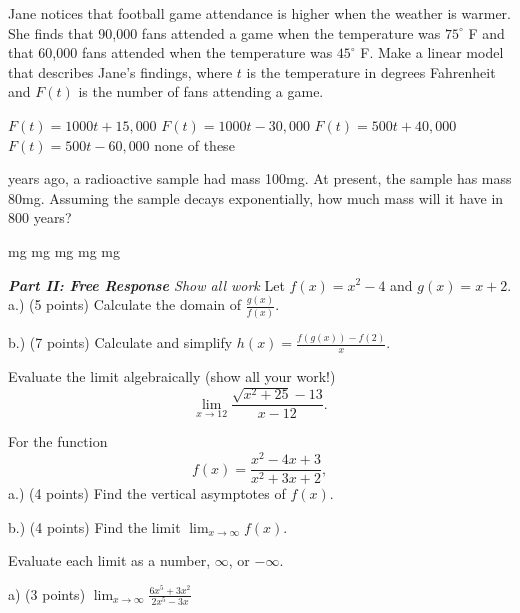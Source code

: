 \documentclass[11pt]{article}
\begin{document}
\begin{questions}
\begin{multiplechoice}{5}
\question Jane notices that football game attendance is higher when the weather is warmer.  She finds that 90,000 fans attended a game when the temperature was $75^\circ$ F and that 60,000 fans attended when the temperature was $45^\circ$ F.  Make a linear model that describes Jane's findings, where $t$ is the temperature in degrees Fahrenheit and $F(t)$ is the number of fans attending a game.
\begin{answers}{3}
\ans $F(t) = 1000t+15,000$
\ans $F(t) = 1000t-30,000$
\ans $F(t) = 500t+40,000$
\ans $F(t) = 500t - 60,000$
\ans none of these
\end{answers}

 years ago, a radioactive sample had mass 100mg.  At present, the sample has mass 80mg.  Assuming the sample decays exponentially, how much mass will it have in 800 years?
\begin{answers}{2}
 mg
 mg %
 mg
 mg
 mg
\end{answers}


\end{multiplechoice}
\vspace{.2in}

\nextpage
\noindent \emph{{\bf Part II: Free Response}{  Show all work}}
\question[12] Let $f(x)=x^2-4$ and $g(x) = x+2$.\\

a.) (5 points) Calculate the domain of $\frac{g(x)}{f(x)}$.
\vspace{1.25in}

b.) (7 points) Calculate and simplify $h(x) = \frac{f(g(x))-f(2)}{x}$.
\vspace{2.25in}




\question[10] Evaluate the limit algebraically (show all your work!)
\[\lim_{x\to 12} \frac{\sqrt{x^2+25} - 13}{x-12}.\]
\vspace{3.25in}

\question[8] For the function 
\[f(x) = \frac{x^2-4x+3}{x^2+3x+2},\]
a.) (4 points) Find the vertical asymptotes of $f(x)$.
\vspace{2.25in}

b.) (4 points) Find the limit $\lim_{x\to \infty} f(x)$.
\vspace{2.25in}

\question[15] Evaluate each limit as a number, $\infty$, or $-\infty$.

a) (3 points) $\displaystyle \lim_{x\to\infty} \frac{6x^5 + 3x^2}{2x^5 - 3x}$


\end{questions}
\end{document}
